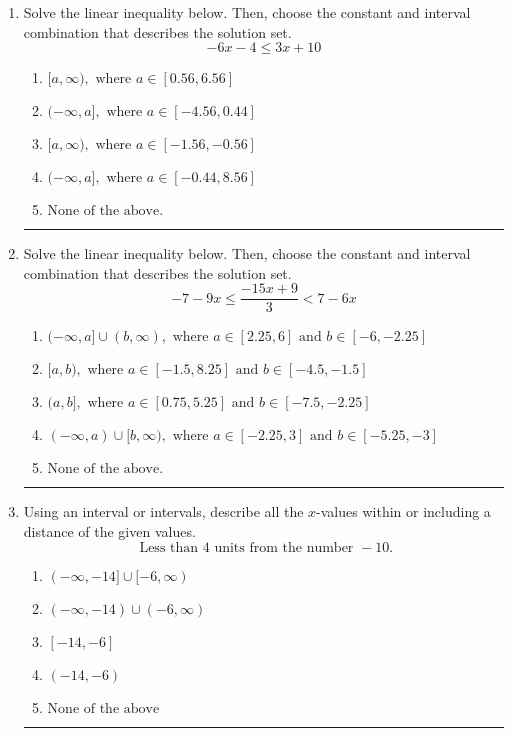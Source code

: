 \documentclass[14pt]{extbook}
\newcommand{\litem}[1]{\item#1\hspace*{-1cm}\rule{\textwidth}{0.4pt}}
\begin{document}
\begin{enumerate}
{\begin{enumerate}[label=\Alph*.]
\end{enumerate} }
\litem{
Solve the linear inequality below. Then, choose the constant and interval combination that describes the solution set.\[ -6x -4 \leq 3x + 10 \]\begin{enumerate}[label=\Alph*.]
\item \( [a, \infty), \text{ where } a \in [0.56, 6.56] \)
\item \( (-\infty, a], \text{ where } a \in [-4.56, 0.44] \)
\item \( [a, \infty), \text{ where } a \in [-1.56, -0.56] \)
\item \( (-\infty, a], \text{ where } a \in [-0.44, 8.56] \)
\item \( \text{None of the above}. \)

\end{enumerate} }
\litem{
Solve the linear inequality below. Then, choose the constant and interval combination that describes the solution set.\[ -7 - 9 x \leq \frac{-15 x + 9}{3} < 7 - 6 x \]\begin{enumerate}[label=\Alph*.]
\item \( (-\infty, a] \cup (b, \infty), \text{ where } a \in [2.25, 6] \text{ and } b \in [-6, -2.25] \)
\item \( [a, b), \text{ where } a \in [-1.5, 8.25] \text{ and } b \in [-4.5, -1.5] \)
\item \( (a, b], \text{ where } a \in [0.75, 5.25] \text{ and } b \in [-7.5, -2.25] \)
\item \( (-\infty, a) \cup [b, \infty), \text{ where } a \in [-2.25, 3] \text{ and } b \in [-5.25, -3] \)
\item \( \text{None of the above.} \)

\end{enumerate} }
\litem{
Using an interval or intervals, describe all the $x$-values within or including a distance of the given values.\[ \text{ Less than } 4 \text{ units from the number } -10. \]\begin{enumerate}[label=\Alph*.]
\item \( (-\infty, -14] \cup [-6, \infty) \)
\item \( (-\infty, -14) \cup (-6, \infty) \)
\item \( [-14, -6] \)
\item \( (-14, -6) \)
\item \( \text{None of the above} \)


\end{enumerate}}
\end{enumerate}
\end{document}
